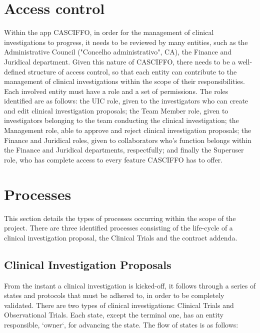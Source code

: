 \section{Access control}
\label{sec:access-control}
Within the app CASCIFFO, in order for the management of clinical investigations to progress, it needs to be reviewed by many entities, such as the Administrative Council ("Concelho administrativo", CA), the Finance and Juridical department.
Given this nature of CASCIFFO, there needs to be a well-defined structure of access control, so that each entity can contribute to the management of clinical investigations within the scope of their responsibilities. Each involved entity must have a role and a set of permissions.  
The roles identified are as follows: the UIC role, given to the investigators who can create and edit clinical investigation proposals; the Team Member role, given to investigators belonging to the team conducting the clinical investigation; the Management role, able to approve and reject clinical investigation proposals; the Finance and Juridical roles, given to collaborators who's function belongs within the Finance and Juridical departments, respectfully; and finally the Superuser role, who has complete access to every feature CASCIFFO has to offer.

\section{Processes} 
\label{sec:processes}
This section details the types of processes occurring within the scope of the project.  
There are three identified processes consisting of the life-cycle of a clinical investigation proposal, the Clinical Trials and the contract addenda. 



\subsection{Clinical Investigation Proposals}
\label{subsec:clinical-investigation-proposals}
From the instant a clinical investigation is kicked-off, it follows through a series of states and protocols that must be adhered to, in order to be completely validated.
There are two types of clinical investigations: Clinical Trials and Observational Trials.  
Each state, except the terminal one, has an entity responsible, `owner`, for advancing the state. 
The flow of states is as follows:  

